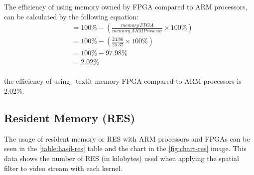
The efficiency of using memory owned by FPGA compared to ARM processors, can be calculated by the following equation:
\begin{equation*}
    \begin{split}
& = 100\% - \left( \frac{memory\ FPGA}{memory\ ARM Prosesor} \times 100\% \right) \\
& = 100\% - \left( \frac{24.86}{25.37} \times 100\% \right) \\
& = 100\% - 97.98\% \\
& = 2.02\% \\
    \end{split}
\end{equation*}

the efficiency of using \ textit {memory} FPGA compared to ARM processors is 2.02\%.


\subsection{Resident Memory (RES)}


The usage of resident memory or RES with ARM processors and FPGAs can be seen in the \ref{table:hasil-res} table and the chart in the \ref{fig:chart-res} image. This data shows the number of RES (in kilobytes) used when applying the spatial filter to video stream with each kernel.

